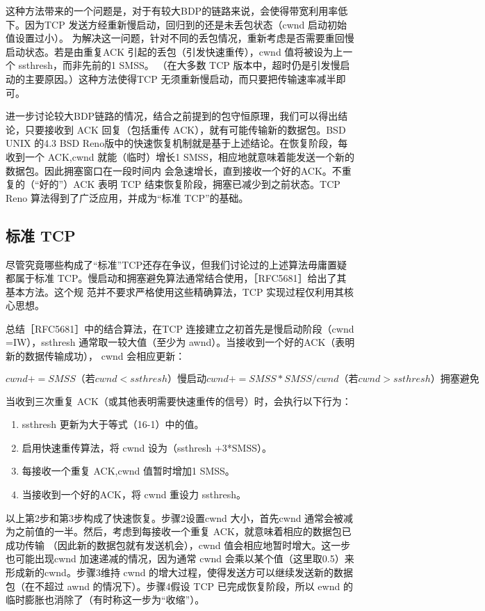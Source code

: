 这种方法带来的一个问题是，对于有较大BDP的链路来说，会使得带宽利用率低下。因为TCP 发送方经重新慢启动，回归到的还是未丢包状态（cwnd 启动初始值设置过小）。
为解决这一问题，针对不同的丢包情况，重新考虑是否需要重回慢启动状态。若是由重复ACK 引起的丢包（引发快速重传），cwnd 值将被设为上一个 ssthresh，而非先前的1 SMSS。
（在大多数 TCP 版本中，超时仍是引发慢启动的主要原因。）这种方法使得TCP 无须重新慢启动，而只要把传输速率减半即可。

进一步讨论较大BDP链路的情况，结合之前提到的包守恒原理，我们可以得出结论，只要接收到 ACK 回复（包括重传 ACK），就有可能传输新的数据包。BSD UNIX 的4.3 BSD
Reno版中的快速恢复机制就是基于上述结论。在恢复阶段，每收到一个 ACK,cwnd 就能（临时）增长1 SMSS，相应地就意味着能发送一个新的数据包。因此拥塞窗口在一段时间内
会急速增长，直到接收一个好的ACK。不重复的（“好的”）ACK 表明 TCP 结束恢复阶段，拥塞已减少到之前状态。TCP Reno 算法得到了广泛应用，并成为“标准 TCP”的基础。

\subsection{标准 TCP}
尽管究竟哪些构成了“标准”TCP还存在争议，但我们讨论过的上述算法毋庸置疑都属于标准 TCP。慢启动和拥塞避免算法通常结合使用，［RFC5681］给出了其基本方法。这个规
范并不要求严格使用这些精确算法，TCP 实现过程仅利用其核心思想。

总结［RFC5681］中的结合算法，在TCP 连接建立之初首先是慢启动阶段（cwnd =IW），ssthresh 通常取一较大值（至少为 awnd）。当接收到一个好的ACK（表明新的数据传输成功），
cwnd 会相应更新：

\begin{equation}
    cwnd += SMSS（若 cwnd < ssthresh）慢启动
    cwnd += SMSS*SMSS/cwnd（若 cwnd>ssthresh）拥塞避免
\end{equation}

当收到三次重复 ACK（或其他表明需要快速重传的信号）时，会执行以下行为：
\begin{enumerate}
    \item ssthresh 更新为大于等式（16-1）中的值。
    \item 启用快速重传算法，将 cwnd 设为（ssthresh +3*SMSS）。
    \item 每接收一个重复 ACK,cwnd 值暂时增加1 SMSS。
    \item 当接收到一个好的ACK，将 cwnd 重设力 ssthresh。
\end{enumerate}

以上第2步和第3步构成了快速恢复。步骤2设置cwnd 大小，首先cwnd 通常会被减为之前值的一半。然后，考虑到每接收一个重复 ACK，就意味着相应的数据包已成功传输
（因此新的数据包就有发送机会），cwnd 值会相应地暂时增大。这一步也可能出现cwnd 加速递减的情况，因为通常 cwnd 会乘以某个值（这里取0.5）来形成新的cwnd。步骤3维持
cwnd 的增大过程，使得发送方可以继续发送新的数据包（在不超过 awnd 的情况下）。步骤4假设 TCP 已完成恢复阶段，所以 ewnd 的临时膨胀也消除了（有时称这一步为“收缩”）。

